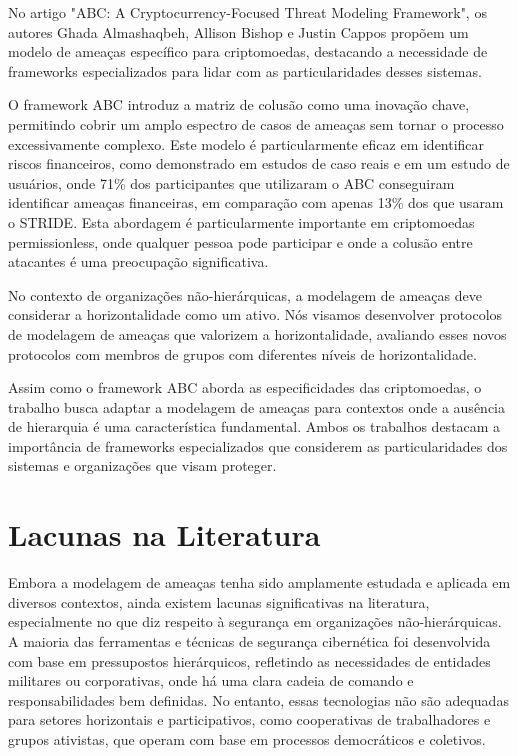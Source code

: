 No artigo "ABC: A Cryptocurrency-Focused Threat Modeling Framework", os autores
Ghada Almashaqbeh, Allison Bishop e Justin Cappos propõem um modelo de ameaças
específico para criptomoedas, destacando a necessidade de frameworks especializados
para lidar com as particularidades desses sistemas. 

O framework ABC introduz a matriz de colusão como uma inovação chave,
permitindo cobrir um amplo espectro de casos de ameaças sem tornar o processo
excessivamente complexo. Este modelo é particularmente eficaz em identificar riscos
financeiros, como demonstrado em estudos de caso reais e em um estudo de usuários, onde
71\% dos participantes que utilizaram o ABC conseguiram identificar ameaças
financeiras, em comparação com apenas 13\% dos que usaram o STRIDE. Esta abordagem é
particularmente importante em criptomoedas permissionless, onde qualquer pessoa pode
participar e onde a colusão entre atacantes é uma preocupação significativa. 

No contexto de organizações não-hierárquicas, a modelagem de ameaças deve considerar
a horizontalidade como um ativo. Nós visamos desenvolver protocolos de modelagem de ameaças que
valorizem a horizontalidade, avaliando esses novos protocolos com membros de grupos
com diferentes níveis de horizontalidade. 

Assim como o framework ABC aborda as especificidades das criptomoedas, o
trabalho busca adaptar a modelagem de ameaças para contextos onde a
ausência de hierarquia é uma característica fundamental. Ambos os trabalhos
destacam a importância de frameworks especializados que considerem as
particularidades dos sistemas e organizações que visam proteger.


\section{Lacunas na Literatura}
\label{sec:introduction}

Embora a modelagem de ameaças tenha sido amplamente estudada e aplicada em
diversos contextos, ainda existem lacunas significativas na literatura, especialmente
no que diz respeito à segurança em organizações não-hierárquicas. A maioria das
ferramentas e técnicas de segurança cibernética foi desenvolvida com base em pressupostos
hierárquicos, refletindo as necessidades de entidades militares ou corporativas, onde há uma
clara cadeia de comando e responsabilidades bem definidas. No entanto, essas
tecnologias não são adequadas para setores horizontais e participativos, como cooperativas
de trabalhadores e grupos ativistas, que operam com base em processos
democráticos e coletivos. 

